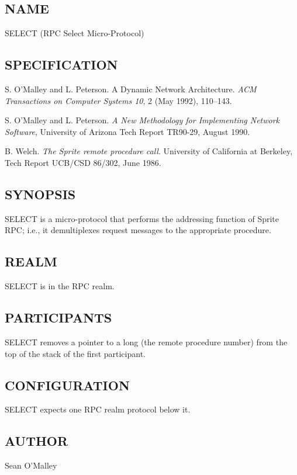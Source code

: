 %
%
%

\subsection*{NAME}

\noindent SELECT (RPC Select Micro-Protocol)

\subsection*{SPECIFICATION}

\noindent 
S. O'Malley and L. Peterson.  A Dynamic Network Architecture.  {\it
ACM Transactions on Computer Systems 10}, 2 (May 1992), 110--143.

\medskip
\noindent  S. O'Malley and L. Peterson. {\it A New Methodology for
Implementing Network Software}, University of Arizona Tech Report
TR90-29, August 1990.

\medskip
\noindent  B. Welch. {\it The Sprite remote procedure call}. 
University of California at Berkeley, Tech Report UCB/CSD 86/302,
June 1986.

\subsection*{SYNOPSIS}

\noindent SELECT is a micro-protocol that performs the addressing
function of Sprite RPC; i.e., it demultiplexes request messages to the
appropriate procedure.  

\subsection*{REALM}

SELECT is in the RPC realm.

\subsection*{PARTICIPANTS}

SELECT removes a pointer to a long (the remote procedure number) from
the top of the stack of the first participant.  

\subsection*{CONFIGURATION}

SELECT expects one RPC realm protocol below it.

\subsection*{AUTHOR}

\noindent Sean O'Malley 
